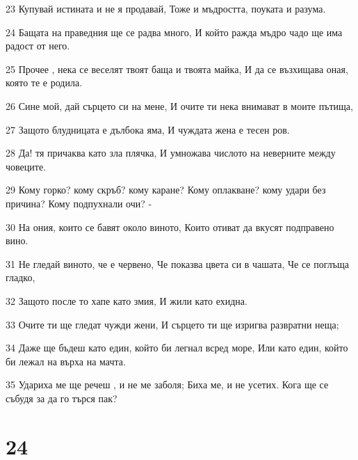 \par 23 Купувай истината и не я продавай, Тоже и мъдростта, поуката и разума.
\par 24 Бащата на праведния ще се радва много, И който ражда мъдро чадо ще има радост от него.
\par 25 Прочее , нека се веселят твоят баща и твоята майка, И да се възхищава оная, която те е родила.
\par 26 Сине мой, дай сърцето си на мене, И очите ти нека внимават в моите пътища,
\par 27 Защото блудницата е дълбока яма, И чуждата жена е тесен ров.
\par 28 Да! тя причаква като зла плячка, И умножава числото на неверните между човеците.
\par 29 Кому горко? кому скръб? кому каране? Кому оплакване? кому удари без причина? Кому подпухнали очи? -
\par 30 На ония, които се бавят около виното, Които отиват да вкусят подправено вино.
\par 31 Не гледай виното, че е червено, Че показва цвета си в чашата, Че се поглъща гладко,
\par 32 Защото после то хапе като змия, И жили като ехидна.
\par 33 Очите ти ще гледат чужди жени, И сърцето ти ще изригва развратни неща;
\par 34 Даже ще бъдеш като един, който би легнал всред море, Или като един, който би лежал на върха на мачта.
\par 35 Удариха ме ще речеш , и не ме заболя; Биха ме, и не усетих. Кога ще се събудя за да го търся пак?

\chapter{24}

